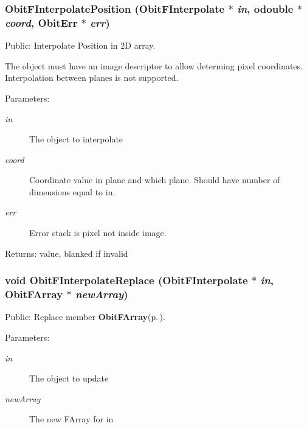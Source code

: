 \subsubsection{ Obit\-FInterpolate\-Position ({\bf Obit\-FInterpolate} $\ast$ {\em in}, {\bf odouble} $\ast$ {\em coord}, {\bf Obit\-Err} $\ast$ {\em err})}\label{ObitFInterpolate_8h_a12}


Public: Interpolate Position in 2D array. 

The object must have an image descriptor to allow determing pixel coordinates. Interpolation between planes is not supported. \begin{Desc}
\item[Parameters:]
\begin{description}
\item[{\em in}]The object to interpolate \item[{\em coord}]Coordinate value in plane and which plane. Should have number of dimensions equal to in. \item[{\em err}]Error stack is pixel not inside image. \end{description}
\end{Desc}
\begin{Desc}
\item[Returns:]value, blanked if invalid \end{Desc}
\subsubsection{\setlength{\rightskip}{0pt plus 5cm}void Obit\-FInterpolate\-Replace ({\bf Obit\-FInterpolate} $\ast$ {\em in}, {\bf Obit\-FArray} $\ast$ {\em new\-Array})}\label{ObitFInterpolate_8h_a9}


Public: Replace member {\bf Obit\-FArray}{\rm (p.\,\pageref{structObitFArray})}. 

\begin{Desc}
\item[Parameters:]
\begin{description}
\item[{\em in}]The object to update \item[{\em new\-Array}]The new FArray for in \end{description}
\end{Desc}
